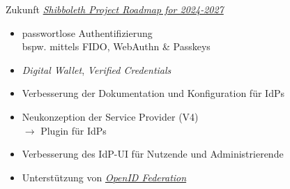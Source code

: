 \begin{frame}{Zukunft}
    \href{https://shibboleth.atlassian.net/wiki/spaces/DEV/pages/3503423489/Project+Roadmap}{\emph{Shibboleth Project Roadmap for 2024-2027}}

    \begin{itemize}
        \item passwortlose Authentifizierung\\bspw. mittels FIDO, WebAuthn \& Passkeys
        \item \emph{Digital Wallet}, \emph{Verified Credentials}
        \item Verbesserung der Dokumentation und Konfiguration für IdPs
        \item Neukonzeption der Service Provider (V4)\\$\to$ Plugin für IdPs
        \item Verbesserung des IdP-UI für Nutzende und Administrierende
        \item Unterstützung von \href{https://openid.net/foundation/}{\emph{OpenID Federation}}~\cite{shibbolethDevelopmentCenterProject2024}
    \end{itemize}
\end{frame}
